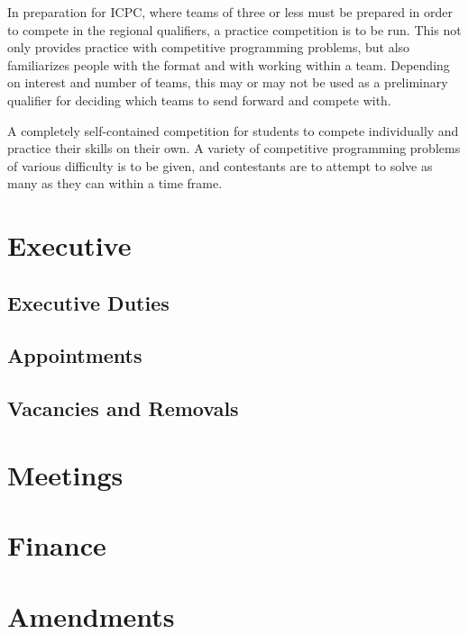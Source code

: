 \documentclass[11pt]{article}
\begin{document}
\vspace{2mm}
\noindent
In preparation for ICPC, where teams of three or less must be prepared in order to compete in the regional qualifiers, a practice competition is to be run. This not only provides practice with competitive programming problems, but also familiarizes people with the format and with working within a team. Depending on interest and number of teams, this may or may not be used as a preliminary qualifier for deciding which teams to send forward and compete with.

\vspace{2mm}
\noindent
A completely self-contained competition for students to compete individually and practice their skills on their own. A variety of competitive programming problems of various difficulty is to be given, and contestants are to attempt to solve as many as they can within a time frame.

\section{Executive}

\subsection{Executive Duties}

\subsection{Appointments}

\subsection{Vacancies and Removals}

\section{Meetings}

\section{Finance}

\section{Amendments}
\end{document}
